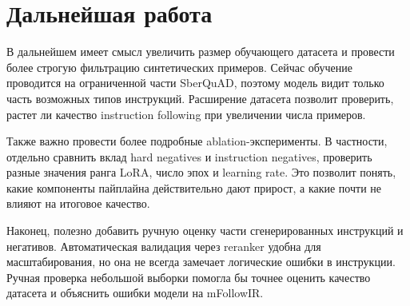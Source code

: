 \documentclass[12pt, a4paper, oneside]{article}
\begin{document}
\section{Дальнейшая работа}

В дальнейшем имеет смысл увеличить размер обучающего датасета и провести более строгую 
фильтрацию синтетических примеров. Сейчас обучение проводится на ограниченной части SberQuAD, 
поэтому модель видит только часть возможных типов инструкций. Расширение датасета позволит 
проверить, растет ли качество instruction following при увеличении числа примеров.

Также важно провести более подробные ablation-эксперименты. В частности, отдельно сравнить 
вклад hard negatives и instruction negatives, проверить разные значения ранга LoRA, число эпох 
и learning rate. Это позволит понять, какие компоненты пайплайна действительно дают прирост, 
а какие почти не влияют на итоговое качество.

Наконец, полезно добавить ручную оценку части сгенерированных инструкций и негативов. 
Автоматическая валидация через reranker удобна для масштабирования, но она не всегда замечает 
логические ошибки в инструкции. Ручная проверка небольшой выборки помогла бы точнее оценить 
качество датасета и объяснить ошибки модели на mFollowIR.

\newpage

\printbibliography[heading=bibintoc, title={Список использованных источников}]
\end{document}
